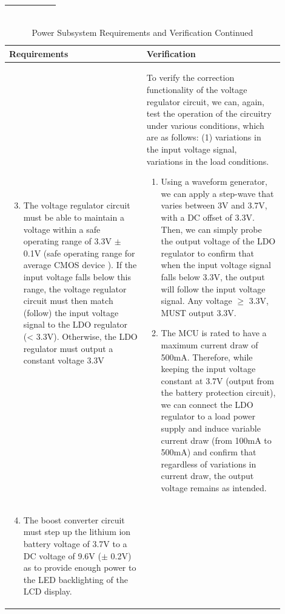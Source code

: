 \documentclass[12pt]{article}
\begin{document}
\begin{table}[!h]
{\begin{tabular}{| p{0.45\linewidth} | p{0.45\linewidth} |}
\begin{enumerate}[label=\alph*)]
		\end{enumerate} \\
		\hline
	\end{tabular}
	}
\end{table}

\begin{table}[!h]
	\caption{Power Subsystem Requirements and Verification Continued}
	\label{tab:p_cont}
	\centering
	{\small
	\begin{tabular}{| p{0.45\linewidth} | p{0.45\linewidth} |} 
 		\hline
 		\textbf{Requirements} & \textbf{Verification} \\ 
		\hline
		\begin{enumerate}
		\setcounter{enumi}{2}
 			\item The voltage regulator circuit must be able to maintain a voltage within a safe operating range of 3.3V $\pm$ 0.1V (safe operating range for average CMOS device \cite{TI_inverter}). If the input voltage falls below this range, the voltage regulator circuit must then match (follow) the input voltage signal to the LDO regulator (< 3.3V). Otherwise, the LDO regulator must output a constant voltage 3.3V
		\end{enumerate} & 
			To verify the correction functionality of the voltage regulator circuit, we can, again, test the operation of the circuitry under various conditions, which are as follows: (1) variations in the input voltage signal, variations in the load conditions.
			\begin{enumerate}[label=\alph*)]
			\item Using a waveform generator, we can apply a step-wave that varies between 3V and 3.7V, with a DC offset of 3.3V. Then, we can simply probe the output voltage of the LDO regulator to confirm that when the input voltage signal falls below 3.3V, the output will follow the input voltage signal. Any voltage $\geq$ 3.3V, MUST output 3.3V. 
			\item The MCU is rated to have a maximum current draw of 500mA. Therefore, while keeping the input voltage constant at 3.7V (output from the battery protection circuit), we can connect the LDO regulator to a load power supply and induce variable current draw (from 100mA to 500mA) and confirm that regardless of variations in current draw, the output voltage remains as intended.
		\end{enumerate} \\
		\hline
		\begin{enumerate}
		\setcounter{enumi}{3}
 			\item The boost converter circuit must step up the lithium ion battery voltage of 3.7V to a DC voltage of 9.6V ($\pm$ 0.2V) as to provide enough power to the LED backlighting of the LCD display.

\end{enumerate}
\end{tabular}}
\end{table}
\end{document}
